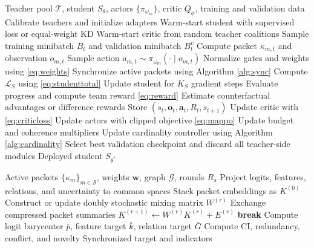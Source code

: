 \documentclass[10pt,twocolumn,a4paper]{article}
\newcommand{\cT}{\mathcal{T}}
\newcommand{\cS}{\mathcal{S}}
\newcommand{\cL}{\mathcal{L}}
\newcommand{\cG}{\mathcal{G}}
\begin{document}
\begin{algorithm}[t]
\caption{CoMTKD-MARL Training}
\label{alg:training}
\begin{algorithmic}[1]
\Require Teacher pool \(\cT\), student \(S_\theta\), actors \(\{\pi_{\omega_m}\}\), critic \(Q_\phi\), training and validation data
\State Calibrate teachers and initialize adapters
\State Warm-start student with supervised loss or equal-weight KD
\State Warm-start critic from random teacher coalitions
    \State Sample training minibatch \(B_t\) and validation minibatch \(B_t^v\)
        \State Compute packet \(\kappa_{m,t}\) and observation \(o_{m,t}\)
        \State Sample action \(a_{m,t}\sim\pi_{\omega_m}(\cdot\mid o_{m,t})\)
    \EndFor
    \State Normalize gates and weights using \cref{eq:weights}
    \State Synchronize active packets using Algorithm \ref{alg:sync}
    \State Compute \(\cL_S\) using \cref{eq:studenttotal}
    \State Update student for \(K_S\) gradient steps
    \State Evaluate progress and compute team reward \cref{eq:reward}
    \State Estimate counterfactual advantages or difference rewards
    \State Store \((s_t,\bm o_t,\bm a_t,R_t,s_{t+1})\)
        \State Update critic with \cref{eq:criticloss}
        \State Update actors with clipped objective \cref{eq:mappo}
        \State Update budget and coherence multipliers
    \EndIf
    \State Update cardinality controller using Algorithm \ref{alg:cardinality}
\EndFor
\State Select best validation checkpoint and discard all teacher-side modules
\Ensure Deployed student \(S_{\theta^*}\)
\end{algorithmic}
\end{algorithm}

\begin{algorithm}[t]
\caption{Knowledge Synchronization}
\label{alg:sync}
\begin{algorithmic}[1]
\Require Active packets \(\{\kappa_m\}_{m\in\cS}\), weights \(\bm w\), graph \(\cG\), rounds \(R_s\)
\State Project logits, features, relations, and uncertainty to common spaces
\State Stack packet embeddings as \(K^{(0)}\)
    \State Construct or update doubly stochastic mixing matrix \(W^{(r)}\)
    \State Exchange compressed packet summaries
    \State \(K^{(r+1)}\gets W^{(r)}K^{(r)}+E^{(r)}\)
        \State \textbf{break}
    \EndIf
\EndFor
\State Compute logit barycenter \(\bar p\), feature target \(\bar k\), relation target \(\bar G\)
\State Compute \(\mathrm{CI}\), redundancy, conflict, and novelty
\Ensure Synchronized target and indicators
\end{algorithmic}
\end{algorithm}
\end{document}
